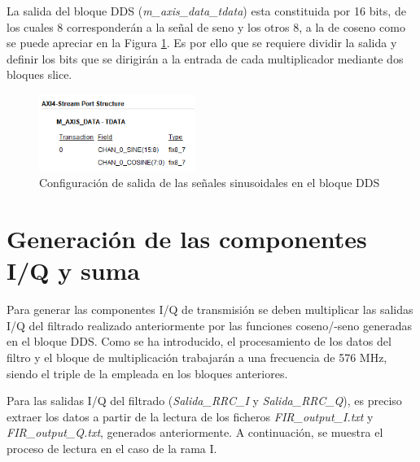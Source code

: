 \vspace{3mm}

La salida del bloque DDS (\textit{m\_axis\_data\_tdata}) esta constituida por 16 bits, de los cuales 8 corresponderán a la señal de seno y los otros 8, a la de coseno como se puede apreciar en la Figura \ref{fig:dds}. Es por ello que se requiere dividir la salida y definir los bits que se dirigirán a la entrada de cada multiplicador mediante dos bloques slice.

\vspace{3mm}

\begin{figure}[h]
    \centering
    \includegraphics[width=0.45\textwidth]{img/diseno/dds.PNG}
    \caption{Configuración de salida de las señales sinusoidales en el bloque DDS}
    \label{fig:dds}
\end{figure}

\section{Generación de las componentes I/Q y suma}

Para generar las componentes I/Q de transmisión se deben multiplicar las salidas I/Q del filtrado realizado anteriormente por las funciones coseno/-seno generadas en el bloque DDS. Como se ha introducido, el procesamiento de los datos del filtro y el bloque de multiplicación trabajarán a una frecuencia de 576 MHz, siendo el triple de la empleada en los bloques anteriores. 

\vspace{3mm}

Para las salidas I/Q del filtrado (\textit{Salida\_RRC\_I} y \textit{Salida\_RRC\_Q}), es preciso extraer los datos a partir de la lectura de los ficheros \textit{FIR\_output\_I.txt} y \textit{FIR\_output\_Q.txt}, generados anteriormente. A continuación, se muestra el proceso de lectura en el caso de la rama I.

\pagebreak

